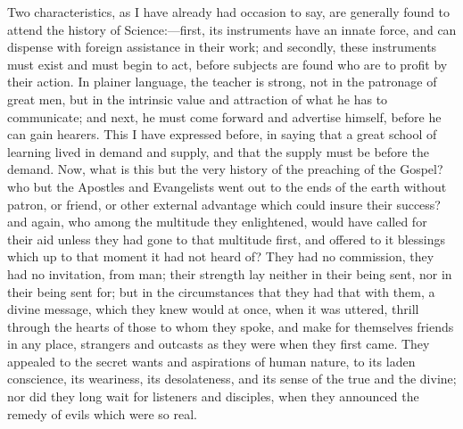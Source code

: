 Two characteristics, as I have
already had occasion to say, are generally found to attend the history
of Science:—first, its instruments have an innate force, and can
dispense with foreign assistance in their work; and secondly, these
instruments must exist and must begin to act, before subjects are
found who are to profit by their action. In plainer language, the
teacher is strong, not in the patronage of great men, but in the
intrinsic value and attraction of what he has to communicate; and
next, he must come forward and advertise himself, before he can gain
hearers. This I have expressed before, in saying that a great school
of learning lived in demand and supply, and that the supply must be
before the demand. Now, what is this but the very history of the
preaching of the Gospel? who but the Apostles and Evangelists went out
to the ends of the earth without patron, or friend, or other external
advantage which could insure their success? and again, who among the
multitude they enlightened, would have called for their aid unless
they had gone to that multitude first, and offered to it blessings
which up to that moment it had not heard of? They had no commission,
they had no invitation, from man; their strength lay neither in their
being sent, nor in their being sent for; but in the circumstances that
they had that with them, a divine message, which they knew would at
once, when it was uttered, thrill through the hearts of those to whom
they spoke, and make for themselves friends in any place, strangers
and outcasts as they were when they first came. They appealed to the
secret wants and aspirations of human nature, to its laden conscience,
its weariness, its desolateness, and its sense of the true and the
divine; nor did they long wait for listeners and disciples, when they
announced the remedy of evils which were so real.

